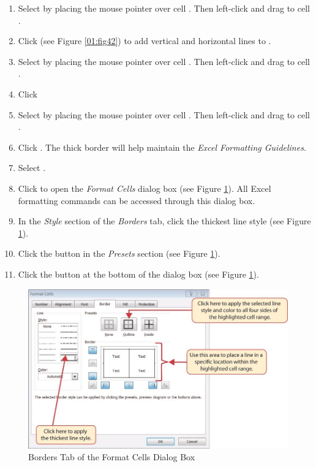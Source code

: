 \begin{enumbox}
\begin{enumerate}
		\item Select  by placing the mouse pointer over cell . Then left-click and drag to cell . 
		\item Click  (see Figure \ref{01:fig42}) to add vertical and horizontal lines to .
		\item Select  by placing the mouse pointer over cell . Then left-click and drag to cell .
		\item Click 
		\item Select  by placing the mouse pointer over cell . Then left-click and drag to cell .
		\item Click . The thick border will help maintain the \textit{Excel Formatting Guidelines}.
		\item Select .
		\item Click  to open the \textit{Format Cells} dialog box (see Figure \ref{01:fig43}). All Excel formatting commands can be accessed through this dialog box.
		\item In the \textit{Style} section of the \textit{Borders} tab, click the thickest line style (see Figure \ref{01:fig43}).
		\item Click the  button in the \textit{Presets} section (see Figure \ref{01:fig43}).
		\item Click the  button at the bottom of the dialog box (see Figure \ref{01:fig43}).
	\end{enumerate}
\end{enumbox}
	
\begin{figure}[H]
	\centering
	\includegraphics[width=\maxwidth{.95\linewidth}]{gfx/ch01_fig43}
	\caption{Borders Tab of the Format Cells Dialog Box}
	\label{01:fig43}
\end{figure}

